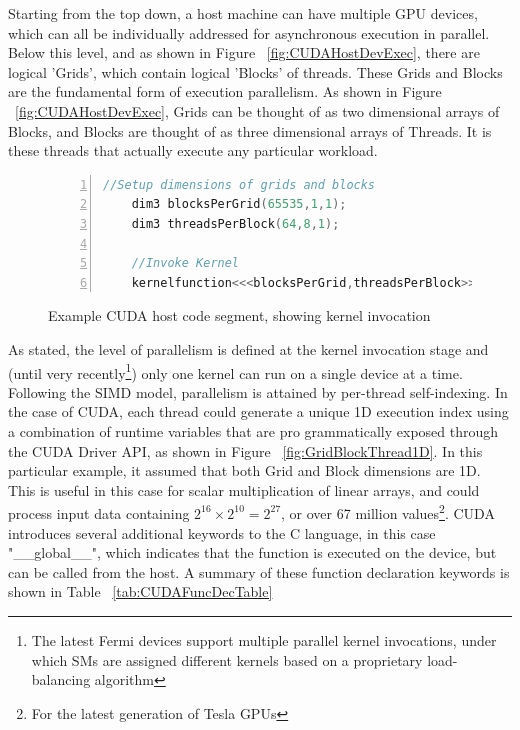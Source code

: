 Starting from the top down, a host machine can have multiple GPU devices, which can all be individually addressed for asynchronous execution in parallel. Below this level, and as shown in Figure ~\ref{fig:CUDAHostDevExec}, there are logical 'Grids', which contain logical 'Blocks' of threads. These Grids and Blocks are the fundamental form of execution parallelism. As shown in Figure ~\ref{fig:CUDAHostDevExec}, Grids can be thought of as two dimensional arrays of Blocks, and Blocks are thought of as three dimensional arrays of Threads. It is these threads that actually execute any particular workload.

\begin{figure}[!h]
  \centering
    \begin{lstlisting}[numbers=left, language=C, numberstyle=\tiny, numbersep=8pt]
    //Setup dimensions of grids and blocks
    dim3 blocksPerGrid(65535,1,1);
    dim3 threadsPerBlock(64,8,1);

    //Invoke Kernel
    kernelfunction<<<blocksPerGrid,threadsPerBlock>>>(*functionarguments);
    \end{lstlisting}
  \caption{Example CUDA host code segment, showing kernel invocation}
  \label{fig:KernelInvocation}
\end{figure}

As stated, the level of parallelism is defined at the kernel invocation stage and (until very recently\footnote{The latest Fermi devices support multiple parallel kernel invocations, under which SMs are assigned different kernels based on a proprietary load-balancing algorithm}) only one kernel can run on a single device at a time. Following the SIMD model, parallelism is attained by per-thread self-indexing. In the case of CUDA, each thread could generate a unique 1D execution index using a combination of runtime variables that are pro grammatically exposed through the CUDA Driver API, as shown in Figure ~\ref{fig:GridBlockThread1D}. In this particular example, it assumed that both Grid and Block dimensions are 1D. This is useful in this case for scalar multiplication of linear arrays, and could process input data containing \(2^{16}\times 2^{10} = 2^{27}\), or over 67 million values\footnote{For the latest generation of Tesla GPUs}. CUDA introduces several additional keywords to the C language, in this case "\_\_global\_\_", which indicates that the function is executed on the device, but can be called from the host. A summary of these function declaration keywords is shown in Table ~\ref{tab:CUDAFuncDecTable}

